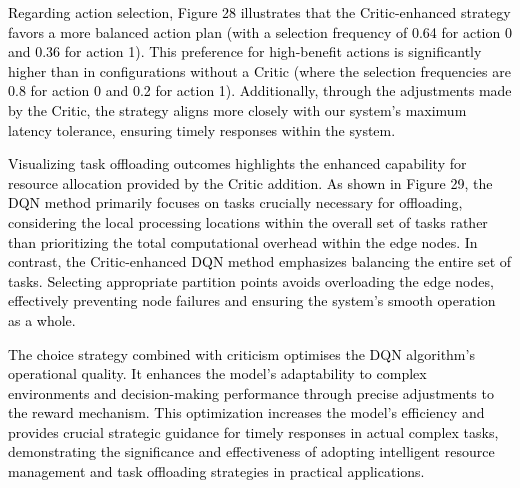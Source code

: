 \documentclass[preprint,12pt]{elsarticle}
\begin{document}
\textcolor{black}{Regarding action selection, Figure 28 illustrates that the Critic-enhanced strategy favors a more balanced action plan (with a selection frequency of 0.64 for action 0 and 0.36 for action 1). This preference for high-benefit actions is significantly higher than in configurations without a Critic (where the selection frequencies are 0.8 for action 0 and 0.2 for action 1). Additionally, through the adjustments made by the Critic, the strategy aligns more closely with our system's maximum latency tolerance, ensuring timely responses within the system.}

\textcolor{black}{Visualizing task offloading outcomes highlights the enhanced capability for resource allocation provided by the Critic addition. As shown in Figure 29, the DQN method primarily focuses on tasks crucially necessary for offloading, considering the local processing locations within the overall set of tasks rather than prioritizing the total computational overhead within the edge nodes. In contrast, the Critic-enhanced DQN method emphasizes balancing the entire set of tasks. Selecting appropriate partition points avoids overloading the edge nodes, effectively preventing node failures and ensuring the system's smooth operation as a whole.}

\textcolor{black}{The choice strategy combined with criticism optimises the DQN algorithm's operational quality. It enhances the model's adaptability to complex environments and decision-making performance through precise adjustments to the reward mechanism. This optimization increases the model's efficiency and provides crucial strategic guidance for timely responses in actual complex tasks, demonstrating the significance and effectiveness of adopting intelligent resource management and task offloading strategies in practical applications.}



\end{document}
